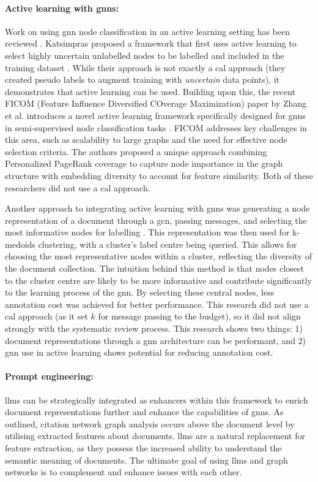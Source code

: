 \documentclass[10pt,oneside]{book}
\begin{document}
\paragraph{Active learning with \glspl*{gnn}:}
Work on using \gls*{gnn} node classification in an active learning setting has been reviewed \cite{madhawa_active_2020}. Katsimpras proposed a framework that first uses active learning to select highly uncertain unlabelled nodes to be labelled and included in the training dataset \cite{katsimpras_improving_2024}. While their approach is not exactly a \gls*{cal} approach (they created pseudo labels to augment training with \emph{uncertain} data points), it demonstrates that active learning can be used. Building upon this, the recent FICOM (Feature Influence Diversified COverage Maximization) paper by Zhang et al. introduces a novel active learning framework specifically designed for \glspl*{gnn} in semi-supervised node classification tasks \cite{zhang_ficom_2024}. FICOM addresses key challenges in this area, such as scalability to large graphs and the need for effective node selection criteria. The authors proposed a unique approach combining Personalized PageRank coverage to capture node importance in the graph structure with embedding diversity to account for feature similarity. Both of these researchers did not use a \gls*{cal} approach.

Another approach to integrating active learning with \glspl*{gnn} was generating a node representation of a document through a \gls*{gcn}, passing messages, and selecting the most informative nodes for labelling \cite{wu_active_2021}. This representation was then used for k-medoids clustering, with a cluster's label centre being queried. This allows for choosing the most representative nodes within a cluster, reflecting the diversity of the document collection. The intuition behind this method is that nodes closest to the cluster centre are likely to be more informative and contribute significantly to the learning process of the \gls*{gnn}. By selecting these central nodes, less annotation cost was achieved for better performance. This research did not use a \gls*{cal} approach (as it set $k$ for message passing to the budget), so it did not align strongly with the systematic review process. This research shows two things: 1) document representations through a \gls*{gnn} architecture can be performant, and 2) \gls*{gnn} use in active learning shows potential for reducing annotation cost.

\paragraph{Prompt engineering:}
\glspl*{llm} can be strategically integrated as enhancers within this framework to enrich document representations further and enhance the capabilities of \glspl*{gnn}. As outlined, citation network graph analysis occurs above the document level by utilising extracted features about documents. \glspl*{llm} are a natural replacement for feature extraction, as they possess the increased ability to understand the semantic meaning of documents. The ultimate goal of using \gls*{llm}s and graph networks is to complement and enhance issues with each other. 
\end{document}
